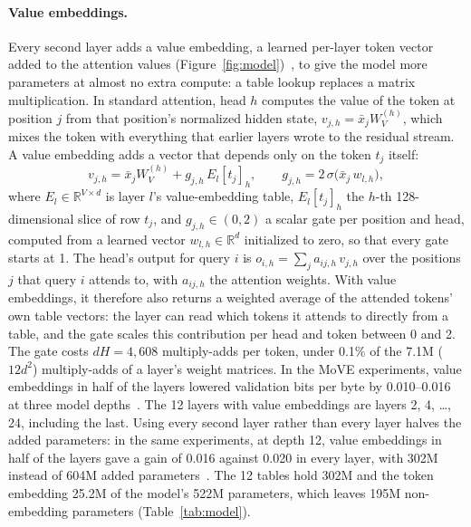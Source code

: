 \documentclass[sigconf,nonacm,balance=false]{acmart}
\begin{document}
\paragraph{Value embeddings.} Every second layer adds a value embedding, a learned per-layer token vector added to the
attention values (Figure~\ref{fig:model})~\cite{li2026move}, to give the model more parameters at almost no extra
compute: a table lookup replaces a matrix multiplication. In standard attention, head $h$ computes the value of the
token at position $j$ from that position's normalized hidden state, $v_{j,h} = \bar{x}_j W_V^{(h)}$, which mixes the
token with everything that earlier layers wrote to the residual stream. A value embedding adds a vector that depends
only on the token $t_j$ itself:
\[
  v_{j,h} = \bar{x}_j W_V^{(h)} + g_{j,h}\, E_l[t_j]_h, \qquad g_{j,h} = 2\,\sigma\big(\bar{x}_j\, w_{l,h}\big),
\]
where $E_l \in \mathbb{R}^{V \times d}$ is layer $l$'s value-embedding table, $E_l[t_j]_h$ the $h$-th 128-dimensional
slice of row $t_j$, and $g_{j,h} \in (0, 2)$ a scalar gate per position and head, computed from a learned vector
$w_{l,h} \in \mathbb{R}^d$ initialized to zero, so that every gate starts at 1. The head's output for query $i$ is
$o_{i,h} = \sum_j a_{ij,h}\, v_{j,h}$ over the positions $j$ that query $i$ attends to, with $a_{ij,h}$ the attention
weights. With value embeddings, it therefore also returns a weighted average of the attended tokens' own table vectors:
the layer can read which tokens it attends to directly from a table, and the gate scales this contribution per head
and token between 0 and 2. The gate costs $d H = 4{,}608$ multiply-adds per token, under 0.1\% of the 7.1M ($12d^2$)
multiply-adds of a layer's weight matrices. In the MoVE experiments, value embeddings in half of the layers lowered
validation bits per byte by 0.010--0.016 at three model depths~\cite{li2026move}. The 12 layers with value embeddings
are layers 2, 4, \ldots, 24, including the last. Using every second layer rather than every layer halves the added
parameters: in the same experiments, at depth 12, value embeddings in half of the layers gave a gain of 0.016 against
0.020 in every layer, with 302M instead of 604M added parameters~\cite{li2026move}. The 12 tables hold 302M and the
token embedding 25.2M of the model's 522M parameters, which leaves 195M non-embedding parameters
(Table~\ref{tab:model}).
\end{document}

